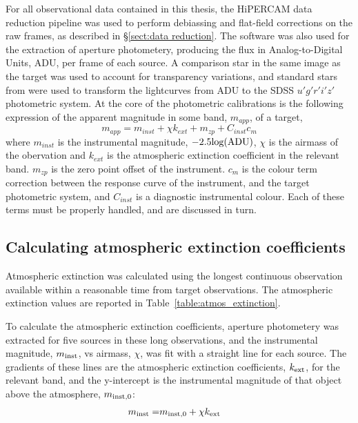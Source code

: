 For all observational data contained in this thesis, the HiPERCAM data reduction pipeline \citep{dhillon2016} was used to perform debiassing and flat-field corrections on the raw frames, as described in \S\ref{sect:data reduction}. The software was also used for the extraction of aperture photometery, producing the flux in Analog-to-Digital Units, ADU, per frame of each source. 
A comparison star in the same image as the target was used to account for transparency variations, and standard stars from \citet{smith2002} were used to transform the lightcurves from ADU to the SDSS $u'g'r'i'z'$ photometric system. At the core of the photometric calibrations is the following expression of the apparent magnitude in some band, $m_{app}$, of a target,
\begin{equation}
    \label{eqn:observations:instrumental magnitude from scratch}
    m_{app} = m_{inst} + \chi k_{ext} + m_{zp} + C_{inst}c_{m}
\end{equation}
where $m_{inst}$ is the instrumental magnitude, $-2.5 \rm log(ADU)$, $\chi$ is the airmass of the obervation and $k_{ext}$ is the atmospheric extinction coefficient in the relevant band. $m_{zp}$ is the zero point offset of the instrument. $c_{m}$ is the colour term correction between the response curve of the instrument, and the target photometric system, and $C_{inst}$ is a diagnostic instrumental colour. Each of these terms must be properly handled, and are discussed in turn. 


\subsection{Calculating atmospheric extinction coefficients}
\label{sect:calcualting atmospheric extinction}

Atmospheric extinction was calculated using the longest continuous observation available within a reasonable time from target observations.
The atmospheric extinction values are reported in Table~\ref{table:atmos_extinction}.

To calculate the atmospheric extinction coefficients, aperture photometery was extracted for five sources in these long observations, and the instrumental magnitude, $m_{\rm inst}$, vs airmass, $\chi$, was fit with a straight line for each source. 
The gradients of these lines are the atmospheric extinction coefficients, $k_{\rm ext}$, for the relevant band, and the y-intercept is the instrumental magnitude of that object above the atmosphere, $m_{\rm inst,0}$:
\begin{align*}
    m_{\rm inst} =& m_{\rm inst,0} + \chi k_{\rm ext} 
\end{align*}

